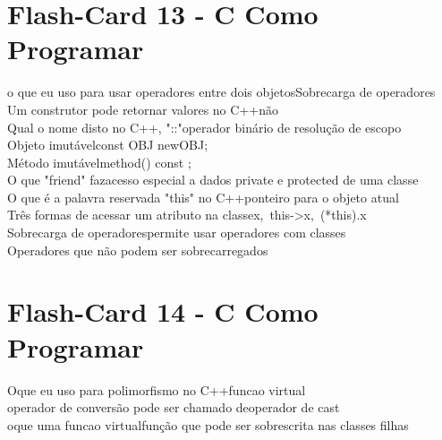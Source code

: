 \documentclass[a4paper,12pt]{article}
\begin{document}
\section*{Flash-Card 13 - C Como Programar} 
o que eu uso para usar operadores entre dois objetos\dotfill Sobrecarga de operadores\\ 
Um construtor pode retornar valores no C++\dotfill não\\ 
Qual o nome disto no C++, "::"\dotfill operador binário de resolução de escopo\\ 
Objeto imutável\dotfill const OBJ newOBJ;\\ 
Método imutável\dotfill method() const {};\\
O que "friend" faz\dotfill acesso especial a dados private e protected de uma classe\\
O que é a palavra reservada "this" no C++\dotfill ponteiro para o objeto atual\\ 
Três formas de acessar um atributo na classe\dotfill x,\ this->x,\ (*this).x\\
Sobrecarga de operadores\dotfill permite usar operadores com classes\\ 
Operadores que não podem ser sobrecarregados\dotfill {}\\

\section*{Flash-Card 14 - C Como Programar} 
Oque eu uso para polimorfismo no C++\dotfill funcao virtual\\ 
operador de conversão pode ser chamado de\dotfill operador de cast\\ 
oque uma funcao virtual\dotfill função que pode ser sobrescrita nas classes filhas\\ 

\end{document}
